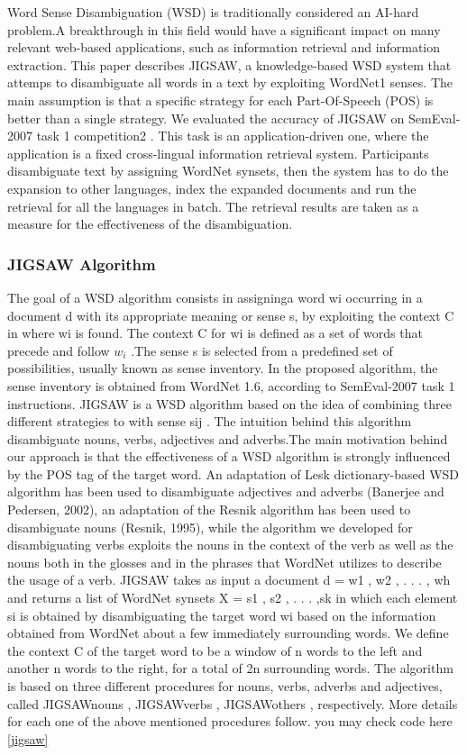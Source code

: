 Word Sense Disambiguation (WSD) is traditionally considered an AI-hard problem.A breakthrough in this field would have a significant impact on many relevant web-based applications, such as information retrieval and information extraction. This paper describes JIGSAW, a knowledge-based  WSD system that attemps to disambiguate all words in a text by exploiting WordNet1   senses. The main assumption is that a specific strategy for each Part-Of-Speech (POS)  is better than a single strategy. We evaluated the accuracy of JIGSAW on SemEval-2007 task 1 competition2 . This task is an  application-driven one, where the application is a fixed cross-lingual information retrieval system. Participants disambiguate text by assigning WordNet synsets, then the  system has to do the expansion to other languages, index the expanded documents and run the retrieval for all the languages in batch. The retrieval results are taken as a measure for the effectiveness of the disambiguation.

\subsubsection{JIGSAW Algorithm}
The goal of a WSD algorithm consists in assigninga word wi occurring in a document d with its appropriate meaning or sense s, by exploiting the context C in where wi is found. The context C for wi is defined as a set of words that precede and follow $w_i$ .The sense s is selected from a predefined set of possibilities, usually known as sense inventory. In the proposed algorithm, the sense inventory is obtained from WordNet 1.6, according to SemEval-2007 task 1 instructions. JIGSAW is a WSD algorithm based on the idea of combining three different strategies to with sense sij . The intuition behind this algorithm disambiguate nouns, verbs, adjectives and adverbs.The main motivation behind our approach is that the effectiveness of a WSD algorithm is strongly influenced by the POS tag of the target word. An adaptation of Lesk dictionary-based WSD algorithm has been used to disambiguate adjectives and adverbs (Banerjee and Pedersen, 2002), an adaptation of the Resnik algorithm has been used to disambiguate nouns (Resnik, 1995), while the algorithm we developed for disambiguating verbs exploits the nouns in the context of the verb as well as the nouns both in the glosses and in the phrases that WordNet utilizes to describe the usage of a verb. JIGSAW takes as input a document d = {w1 , w2 , . . . , wh } and returns a list of WordNet synsets X = {s1 , s2 , . . . ,sk } in which each element si is obtained by disambiguating the target word wi based on the information obtained from WordNet about a few immediately surrounding words. We define the context C of the target word to be a window of n words to the left and another n words to the right, for a total of 2n surrounding words. The algorithm is based on three different procedures for nouns, verbs, adverbs and adjectives, called JIGSAWnouns , JIGSAWverbs , JIGSAWothers , respectively. More details for each one of the above mentioned procedures follow.
you may check code here \ref{jigsaw}     

